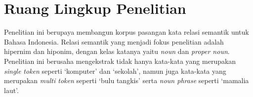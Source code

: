 \section{Ruang Lingkup Penelitian}
Penelitian ini berupaya membangun korpus pasangan kata relasi semantik untuk Bahasa Indonesia. Relasi semantik yang menjadi fokus penelitian adalah hipernim dan hiponim, dengan kelas katanya yaitu \textit{noun} dan \textit{proper noun}. Penelitian ini berusaha mengekstrak tidak hanya kata-kata yang merupakan \textit{single token} seperti `komputer' dan `sekolah', namun juga kata-kata yang merupakan \textit{multi token} seperti `bulu tangkis' serta \textit{noun phrase} seperti `mamalia laut'.


